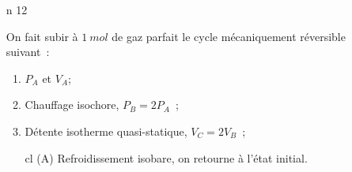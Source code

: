 \documentclass[a4paper, 10pt, final, garamond]{book}
\begin{document}
\begin{enumerate}[label=\sqenumi]
\begin{isd}
\begin{center}
{			}
			\vspace{-15pt}
		\end{center}
		\vspace{-15pt}
	\end{isd}
	\item[n]{12}%
	~
	\smallbreak
	\vspace*{-25pt}
	\begin{isd}[righthand ratio=.30, interior hidden]
		On fait subir à $\SI{1}{mol}$ de gaz parfait le cycle mécaniquement
		réversible suivant~:
		\begin{enumerate}[label=\clalphi]
			\item $P_A$ et $V_A$;
			\item Chauffage isochore, $P_B = 2P_A$~;
			\item Détente isotherme quasi-statique, $V_C = 2V_B$~;
			      \item[cl](A) Refroidissement isobare, on retourne à l'état initial.
		\end{enumerate}
		\tcblower
		\begin{center}
\end{center}
\end{isd}
\end{enumerate}
\end{document}
